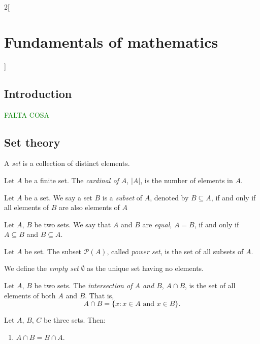 \documentclass[../../../main.tex]{subfiles}
\begin{document}
\begin{multicols}{2}[\section{Fundamentals of mathematics}]
    \subsection{Introduction}
    \textcolor{green}{FALTA COSA}
    \subsection{Set theory}
    \begin{definition}
        A \textit{set} is a collection of distinct elements.
    \end{definition}
    \begin{definition}
        Let $A$ be a finite set. The \textit{cardinal of $A$}, $|A|$, is the number of elements in $A$.
    \end{definition}
    \begin{definition}
        Let $A$ be a set. We say a set $B$ is a \textit{subset} of $A$, denoted by $B\subseteq A$, if and only if all elements of $B$ are also elements of $A$
    \end{definition}
    \begin{definition}
        Let $A$, $B$ be two sets. We say that $A$ and $B$ are \textit{equal}, $A=B$, if and only if $A\subseteq B$ and $B\subseteq A$.
    \end{definition}
    \begin{definition}
        Let $A$ be set. The subset $\mathcal{P}(A)$, called \textit{power set}, is the set of all subsets of $A$.
    \end{definition}
    \begin{definition}
        We define the \textit{empty set} $\emptyset$ as the unique set having no elements.
    \end{definition}
    \begin{definition}
        Let $A$, $B$ be two sets. The \textit{intersection of $A$ and $B$}, $A\cap B$, is the set of all elements of both $A$ and $B$. That is, $$A\cap B=\{x:x\in A\text{ and }x\in B\}.$$
    \end{definition}
    \begin{prop}
        Let $A$, $B$, $C$ be three sets. Then:
        \begin{enumerate}
            \item $A\cap B=B\cap A$.

\end{enumerate}
\end{prop}
\end{multicols}
\end{document}

